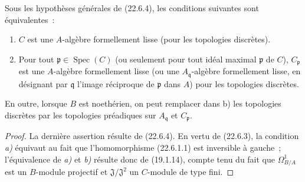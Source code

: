 \begin{corollary}[22.6.6]
\label{0.22.6.6-fr}
Sous les hypothèses générales de \textup{(22.6.4)}, les conditions suivantes sont
équivalentes~:
\begin{enumerate}
  \item[\textup{a)}] $C$ est une $A$-algèbre formellement lisse (pour les topologies
  discrètes).
  \item[\textup{b)}] Pour tout $\mathfrak p\in\operatorname{Spec}(C)$ \textup{(ou seulement pour tout idéal}
  maximal \textup{$\mathfrak p$ de $C$)}, $C_{\mathfrak p}$ est une $A$-algèbre
  formellement lisse \textup{(ou une $A_{\mathfrak q}$-algèbre formellement lisse, en
  désignant par $\mathfrak q$ l'image réciproque de $\mathfrak p$ dans $A$)}
  pour les topologies discrètes.
\end{enumerate}
En outre, lorsque $B$ est noethérien, on peut remplacer dans \textup{b)} les topologies
discrètes par les topologies préadiques sur $A_{\mathfrak q}$ et
$C_{\mathfrak p}$.
\end{corollary}

\begin{proof}
La dernière assertion résulte de (22.6.4). En vertu de (22.6.3), la condition
\emph{a)} équivaut au fait que l'homomorphisme (22.6.1.1) est inversible à gauche~;
l'équivalence de \emph{a)} et \emph{b)} résulte donc de (19.1.14), compte tenu du fait que
$\Omega^1_{B/A}$ est un $B$-module projectif et $\mathfrak J/\mathfrak J^2$
un $C$-module de type fini.
\end{proof}

